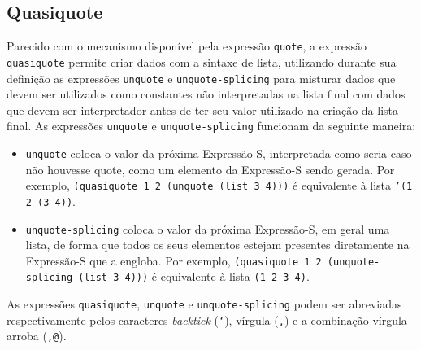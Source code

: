 \subsection{Quasiquote}
\label{ss:quasiquote}

Parecido com o mecanismo disponível pela expressão \texttt{quote}, a expressão
\texttt{quasiquote} permite criar dados com a sintaxe de lista, utilizando
durante sua definição as expressões \texttt{unquote} e \texttt{unquote-splicing}
para misturar dados que devem ser utilizados como constantes não interpretadas
na lista final com dados que devem ser interpretador antes de ter seu valor 
utilizado na criação da lista final. As expressões \texttt{unquote} e 
\texttt{unquote-splicing} funcionam da seguinte maneira:

\begin{itemize}

\item \texttt{unquote} coloca o valor da próxima Expressão-S, interpretada como
seria caso não houvesse quote, como um elemento da Expressão-S sendo gerada.
Por exemplo, \texttt{(quasiquote 1 2 (unquote (list 3 4)))} é equivalente à lista
\texttt{'(1 2 (3 4))}.

\item \texttt{unquote-splicing} coloca o valor da próxima Expressão-S, em geral
uma lista, de forma que todos os seus elementos estejam presentes diretamente
na Expressão-S que a engloba. Por exemplo, \texttt{(quasiquote 1 2
(unquote-splicing (list 3 4)))} é equivalente à lista \texttt{(1 2 3 4)}.

\end{itemize}

As expressões \texttt{quasiquote}, \texttt{unquote} e \texttt{unquote-splicing}
podem ser abreviadas respectivamente pelos caracteres \textit{backtick}
(\texttt{`}), vírgula (\texttt{,}) e a combinação vírgula-arroba (\texttt{,@}).
